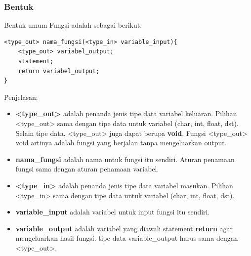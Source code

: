 \documentclass[12pt,]{article}
\begin{document}
	\subsubsection{Bentuk}
	Bentuk umum Fungsi adalah sebagai berikut:
	\begin{verbatim}
<type_out> nama_fungsi(<type_in> variable_input){
	<type_out> variabel_output;
	statement;
	return variabel_output;
}
	\end{verbatim}
	Penjelasan:
	\begin{itemize}
		\item \textbf{<type\_out>} adalah penanda jenis tipe data variabel keluaran.
		Pilihan <type\_out> sama dengan tipe data untuk variabel (char, int, float, dst).
		Selain tipe data, <type\_out> juga dapat berupa \textbf{void}.
		Fungsi <type\_out> void artinya adalah fungsi yang berjalan tanpa mengeluarkan output.
		
		\item \textbf{nama\_fungsi} adalah nama untuk fungsi itu sendiri.
		Aturan penamaan fungsi sama dengan aturan penamaan variabel.
		
		\item \textbf{<type\_in>} adalah penanda jenis tipe data variabel masukan.
		Pilihan <type\_in> sama dengan tipe data untuk variabel (char, int, float, dst).
		
		\item \textbf{variable\_input} adalah variabel untuk input fungsi itu sendiri.
		
		\item \textbf{variable\_output} adalah variabel yang diawali statement \textbf{return} agar mengeluarkan hasil fungsi.
		tipe data variable\_output harus sama dengan <type\_out>.
	\end{itemize}
\end{document}
